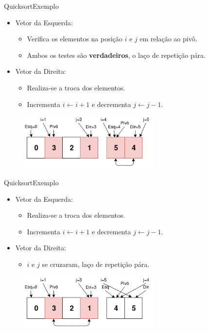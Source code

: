 \documentclass[aspectratio=169]{beamer}
\begin{document}

\begin{frame}{Quicksort}{Exemplo}
\begin{itemize}
 \item Vetor da Esquerda:
\begin{itemize}
 \item Verifica os elementos na posição $i$ e $j$ em relação ao pivô.
 \item Ambos os testes são {\bf verdadeiros}, o laço de repetição pára.
\end{itemize}
\item Vetor da Direita:
\begin{itemize}
\item Realiza-se a troca dos elementos.
\item Incrementa $i\leftarrow i + 1$ e decrementa $j \leftarrow j - 1$.
\end{itemize}
\end{itemize}

\begin{figure}[!h]
  \centering
  \includegraphics[width=200pt]{imgs/quick/quick25.png}
  \label{fig_quick25}
\end{figure}

\end{frame}


\begin{frame}{Quicksort}{Exemplo}
\begin{itemize}
 \item Vetor da Esquerda:
\begin{itemize}
 \item Realiza-se a troca dos elementos.
 \item Incrementa $i\leftarrow i + 1$ e decrementa $j \leftarrow j - 1$.
\end{itemize}
\item Vetor da Direita:
\begin{itemize}
\item $i$ e $j$ se cruzaram, laço de repetição pára.
\end{itemize}
\end{itemize}

\begin{figure}[!h]
  \centering
  \includegraphics[width=200pt]{imgs/quick/quick26.png}
  \label{fig_quick26}
\end{figure}

\end{frame}
\end{document}
